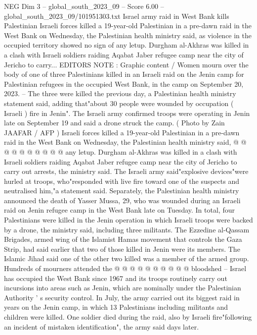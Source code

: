 \begin{textsample}{NEG Dim 3 – global\_south\_2023\_09 – Score 6.00 – global\_south\_2023\_09/101951303.txt}  \label{ex:f3_neg_337}
Israel army raid in West Bank kills Palestinian Israeli forces killed a 19-year-old Palestinian in a pre-dawn raid in the West Bank on Wednesday, the Palestinian health ministry said, as violence in the occupied territory showed no sign of any letup.
Durgham al-Akhras was killed in a clash with Israeli soldiers raiding Aqabat Jaber refugee camp near the city of Jericho to carry...
EDITORS NOTE : Graphic content / Women mourn over the body of one of three Palestinians killed in an Israeli raid on the Jenin camp for Palestinian refugees in the occupied West Bank, in the camp on September 20, 2023. -- The three were killed the previous day, a Palestinian health ministry statement said, adding that"about 30 people were wounded by occupation ( Israeli ) fire in Jenin".
The Israeli army confirmed troops were operating in Jenin late on September 19 and said a drone struck the camp. ( Photo by Zain JAAFAR / AFP ) Israeli forces killed a 19-year-old Palestinian in a pre-dawn raid in the West Bank on Wednesday, the Palestinian health ministry said, @ @ @ @ @ @ @ @ @ @ any letup.
Durgham al-Akhras was killed in a clash with Israeli soldiers raiding Aqabat Jaber refugee camp near the city of Jericho to carry out arrests, the ministry said.
The Israeli army said"explosive devices"were hurled at troops, who"responded with live fire toward one of the suspects and neutralised him,"a statement said.
Separately, the Palestinian health ministry announced the death of Yasser Mussa, 29, who was wounded during an Israeli raid on Jenin refugee camp in the West Bank late on Tuesday.
In total, four Palestinians were killed in the Jenin operation in which Israeli troops were backed by a drone, the ministry said, including three militants.
The Ezzedine al-Qassam Brigades, armed wing of the Islamist Hamas movement that controls the Gaza Strip, had said earlier that two of those killed in Jenin were its members.
The Islamic Jihad said one of the other two killed was a member of the armed group.
Hundreds of mourners attended the @ @ @ @ @ @ @ @ @ @ bloodshed -- Israel has occupied the West Bank since 1967 and its troops routinely carry out incursions into areas such as Jenin, which are nominally under the Palestinian Authority ' s security control.
In July, the army carried out its biggest raid in years on the Jenin camp, in which 13 Palestinians including militants and children were killed.
One soldier died during the raid, also by Israeli fire"following an incident of mistaken identification", the army said days later.

\end{textsample}

